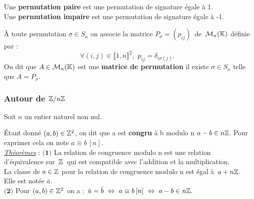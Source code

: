 \vspace{1.2cm}

\noindent Une \textbf{permutation paire} est une permutation de signature égale à 1.\\
Une \textbf{permutation impaire} est une permutation de signature égale à -1.

\vspace{1cm}

\noindent À toute permutation \(\sigma \in S_n\) on associe la matrice \(P_\sigma =(p_{ij})\,\) de \(\,\mathcal{M}_n(\mathbb{K})\) définie par :\vspace{-0.4cm}\\
\[\forall (i,j)\in \llbracket 1,n \rrbracket ^2,\ \, p_{ij}=\delta_{i\sigma(j)}.\]
\vspace{-0cm}
\noindent On dit que \(A\in \mathcal{M}_n(\mathbb{K})\) est une \textbf{matrice de permutation} \ssi il existe \(\sigma \in S_n\) telle que \(A=P_\sigma\).

\newpage

\subsubsection{Autour de $\mathbb{Z}/n\mathbb{Z}$}
\vspace{0.5cm}
\begin{center}
    Soit $n$ un entier naturel non nul.
\end{center}

\vspace{1cm}

Étant donné \((a,b)\in \mathbb{Z}^2\), on dit que a est \textbf{congru} à b modulo n \ssi \(a-b\in n\mathbb{Z}\). Pour exprimer cela on note \(a\equiv b\, [n]\).\vspace{0.5cm}\\
\underline{\emph{Théorèmes}} : \(\bigl(\mathbf{1}\bigr)\) La relation de congruence modulo n est une relation d'équivalence sur $\,\mathbb{Z}\,$ qui est compatible avec l'addition et la multiplication.\\
La classe de \(a\in \mathbb{Z}\) pour la relation de congruence modulo n est égal à \(\, a+n\mathbb{Z}\). Elle est notée \(\bar{a}\).\vspace{0.1cm}\vspace{0.3cm}\\
\(\bigl(\mathbf{2}\bigr)\) Pour \((a,b)\in \mathbb{Z}^2\, \) on a : \(\, \bar{a}=\Bar{b}\ \Leftrightarrow \ a\equiv b\, [n]\ \Leftrightarrow \ a-b\in n\mathbb{Z}. \)

